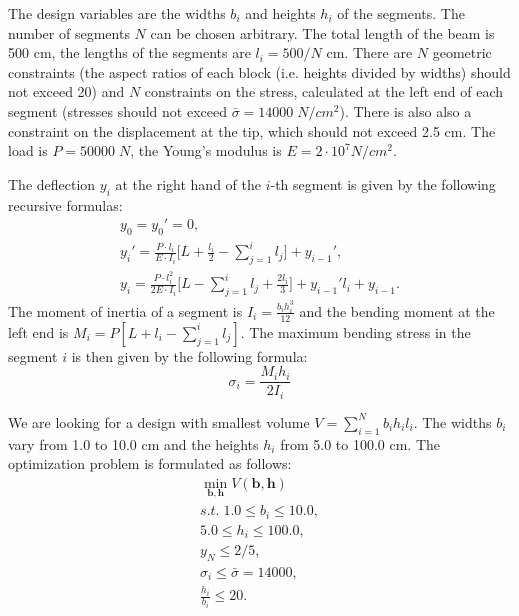 \documentclass{llncs}
\begin{document}
The design variables are the widths $b_i$ and heights $h_i$ of the segments. The number of segments $N$ can be chosen arbitrary. The total length of the beam is 500 cm, the lengths of the segments are $l_i=500/N$  cm. There are $N$ geometric constraints (the aspect ratios of each block (i.e. heights divided by widths) should not exceed 20) and $N$ constraints on the stress, calculated at the left end of each segment (stresses should not exceed  $\bar{\sigma}=14000\; N/cm^2$). There is also also a constraint on the displacement at the tip, which should not exceed 2.5 cm. The load is $P = 50 000\; N$, the Young's modulus is $E=2\cdot 10^7  N/cm^2$.

The deflection $y_i$ at the right hand of the $i$-th segment is given by the following recursive formulas:
\begin{displaymath}
  \begin{array}{c}
    y_0=y_0'=0, \\
    y_i'=\frac{P\cdot l_i}{E\cdot I_i}\Big[ L+\frac{l_i}{2}-\sum\limits_{j=1}^i l_j\Big]+y_{i-1}', \\
    y_i=\frac{P\cdot l_i^2}{2E\cdot I_i}\Big[L-\sum\limits_{j=1}^i l_j + \frac{2l_i}{3}\Big]+y_{i-1}'l_i+y_{i-1}.
  \end{array}
\end{displaymath}
The moment of inertia of a segment is $I_i=\frac{b_i h_i^3}{12}$ and the bending moment at the left end is $M_i=P[L+l_i- \sum_{j=1}^{i}  l_j ]$. The maximum bending stress in the segment $i$ is then given by the following formula:
\begin{displaymath}
  \sigma_i=\frac{M_i h_i}{2I_i}
\end{displaymath}

We are looking for a design with smallest volume $V = \sum_{i=1}^N b_i h_i l_i$. The widths $b_i$ vary from 1.0 to 10.0 cm and the heights $h_i$ from 5.0 to 100.0 cm. The optimization problem is formulated as follows:
\begin{displaymath}
  \begin{array}{c}
    \min\limits_{\pmb b, \pmb h}V(\pmb b, \pmb h) \\
    s.t.\;1.0\le b_i \le 10.0, \\
    5.0 \le h_i \le 100.0, \\
    y_N\le 2/5, \\
    \sigma_i \le \bar{\sigma}=14000, \\
    \frac{h_i}{b_i}\le 20.
  \end{array}
\end{displaymath}
\end{document}
